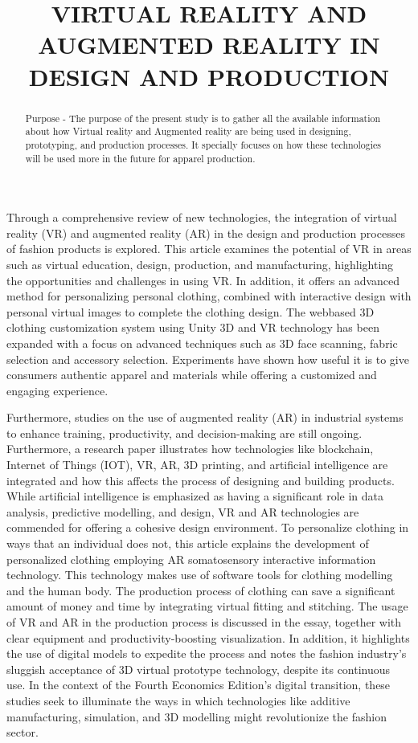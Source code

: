 \documentclass[10pt]{article}
\title{VIRTUAL REALITY AND AUGMENTED REALITY IN DESIGN AND PRODUCTION }
\author{}
\date{}
\begin{document}
\maketitle
\begin{abstract}
Purpose - The purpose of the present study is to gather all the available information about how Virtual reality and Augmented reality are being used in designing, prototyping, and production processes. It specially focuses on how these technologies will be used more in the future for apparel production.
\end{abstract}

Through a comprehensive review of new technologies, the integration of virtual reality (VR) and augmented reality (AR) in the design and production processes of fashion products is explored. This article examines the potential of VR in areas such as virtual education, design, production, and manufacturing, highlighting the opportunities and challenges in using VR. In addition, it offers an advanced method for personalizing personal clothing, combined with interactive design with personal virtual images to complete the clothing design. The webbased 3D clothing customization system using Unity 3D and VR technology has been expanded with a focus on advanced techniques such as 3D face scanning, fabric selection and accessory selection. Experiments have shown how useful it is to give consumers authentic apparel and materials while offering a customized and engaging experience.

Furthermore, studies on the use of augmented reality (AR) in industrial systems to enhance training, productivity, and decision-making are still ongoing. Furthermore, a research paper illustrates how technologies like blockchain, Internet of Things (IOT), VR, AR, 3D printing, and artificial intelligence are integrated and how this affects the process of designing and building products. While artificial intelligence is emphasized as having a significant role in data analysis, predictive modelling, and design, VR and AR technologies are commended for offering a cohesive design environment. To personalize clothing in ways that an individual does not, this article explains the development of personalized clothing employing AR somatosensory interactive information technology. This technology makes use of software tools for clothing modelling and the human body. The production process of clothing can save a significant amount of money and time by integrating virtual fitting and stitching. The usage of VR and AR in the production process is discussed in the essay, together with clear equipment and productivity-boosting visualization. In addition, it highlights the use of digital models to expedite the process and notes the fashion industry's sluggish acceptance of 3D virtual prototype technology, despite its continuous use. In the context of the Fourth Economics Edition's digital transition, these studies seek to illuminate the ways in which technologies like additive manufacturing, simulation, and 3D modelling might revolutionize the fashion sector.
\end{document}
